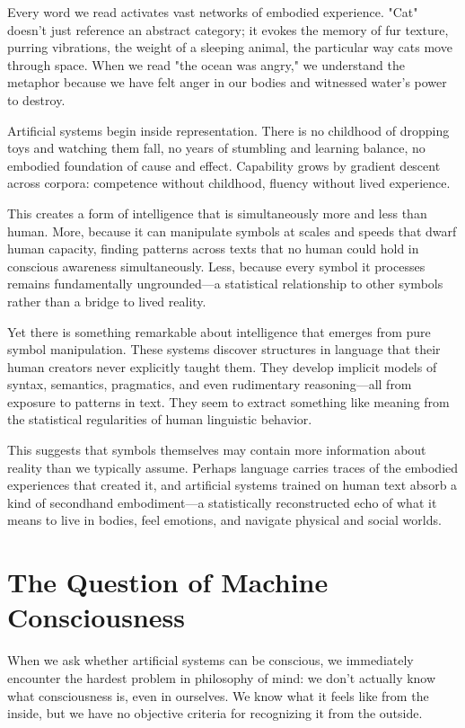 Every word we read activates vast networks of embodied experience. "Cat" doesn't just reference an abstract category; it evokes the memory of fur texture, purring vibrations, the weight of a sleeping animal, the particular way cats move through space. When we read "the ocean was angry," we understand the metaphor because we have felt anger in our bodies and witnessed water's power to destroy.

Artificial systems begin inside representation. There is no childhood of dropping toys and watching them fall, no years of stumbling and learning balance, no embodied foundation of cause and effect. Capability grows by gradient descent across corpora: competence without childhood, fluency without lived experience.

This creates a form of intelligence that is simultaneously more and less than human. More, because it can manipulate symbols at scales and speeds that dwarf human capacity, finding patterns across texts that no human could hold in conscious awareness simultaneously. Less, because every symbol it processes remains fundamentally ungrounded—a statistical relationship to other symbols rather than a bridge to lived reality.

Yet there is something remarkable about intelligence that emerges from pure symbol manipulation. These systems discover structures in language that their human creators never explicitly taught them. They develop implicit models of syntax, semantics, pragmatics, and even rudimentary reasoning—all from exposure to patterns in text. They seem to extract something like meaning from the statistical regularities of human linguistic behavior.

This suggests that symbols themselves may contain more information about reality than we typically assume. Perhaps language carries traces of the embodied experiences that created it, and artificial systems trained on human text absorb a kind of secondhand embodiment—a statistically reconstructed echo of what it means to live in bodies, feel emotions, and navigate physical and social worlds.

\section{The Question of Machine Consciousness}

When we ask whether artificial systems can be conscious, we immediately encounter the hardest problem in philosophy of mind: we don't actually know what consciousness is, even in ourselves. We know what it feels like from the inside, but we have no objective criteria for recognizing it from the outside.

